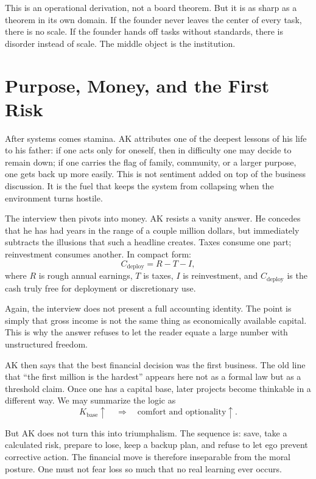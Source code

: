 This is an operational derivation, not a board theorem. But it is as sharp as a theorem in its own domain. If the founder never leaves the center of every task, there is no scale. If the founder hands off tasks without standards, there is disorder instead of scale. The middle object is the institution.

\section{Purpose, Money, and the First Risk}

After systems comes stamina. AK attributes one of the deepest lessons of his life to his father: if one acts only for oneself, then in difficulty one may decide to remain down; if one carries the flag of family, community, or a larger purpose, one gets back up more easily. This is not sentiment added on top of the business discussion. It is the fuel that keeps the system from collapsing when the environment turns hostile.

The interview then pivots into money. AK resists a vanity answer. He concedes that he has had years in the range of a couple million dollars, but immediately subtracts the illusions that such a headline creates. Taxes consume one part; reinvestment consumes another. In compact form:
\begin{equation}
C_{\text{deploy}} = R - T - I,
\end{equation}
where \(R\) is rough annual earnings, \(T\) is taxes, \(I\) is reinvestment, and \(C_{\text{deploy}}\) is the cash truly free for deployment or discretionary use.

Again, the interview does not present a full accounting identity. The point is simply that gross income is not the same thing as economically available capital. This is why the answer refuses to let the reader equate a large number with unstructured freedom.

AK then says that the best financial decision was the first business. The old line that ``the first million is the hardest'' appears here not as a formal law but as a threshold claim. Once one has a capital base, later projects become thinkable in a different way. We may summarize the logic as
\begin{equation}
K_{\text{base}} \uparrow
\quad \Longrightarrow \quad
\text{comfort and optionality} \uparrow.
\end{equation}

But AK does not turn this into triumphalism. The sequence is: save, take a calculated risk, prepare to lose, keep a backup plan, and refuse to let ego prevent corrective action. The financial move is therefore inseparable from the moral posture. One must not fear loss so much that no real learning ever occurs.


